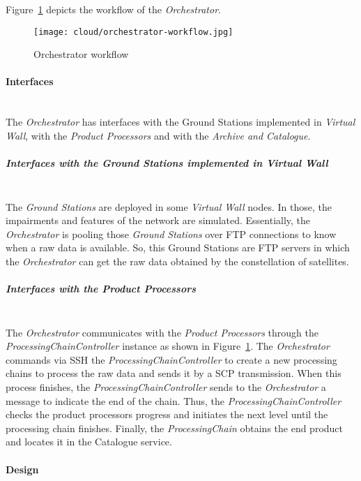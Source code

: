Figure~\ref{fig:orchestrator-workflow} depicts the workflow of the \emph{Orchestrator}.

\begin{figure}[!h]
\begin{center}
\texttt{[image: cloud/orchestrator-workflow.jpg]}
\caption{Orchestrator workflow}
\label{fig:orchestrator-workflow}
\end{center}
\end{figure}

\paragraph{Interfaces}~\\

The \emph{Orchestrator} has interfaces with the Ground Stations implemented in
\emph{Virtual Wall}, with the \emph{Product Processors} and with the
\emph{Archive and Catalogue}.
\subparagraph{Interfaces with the Ground Stations implemented in Virtual
  Wall}~\\

The \emph{Ground Stations} are deployed in some \emph{Virtual Wall} nodes. In
those, the impairments and features of the network are simulated. Essentially,
the \emph{Orchestrator} is pooling those \emph{Ground Stations} over \ac{FTP}
connections to know when a raw data is available. So, this Ground Stations are
\ac{FTP} servers in which the \emph{Orchestrator} can get the raw data obtained
by the constellation of satellites.

\subparagraph{Interfaces with the Product Processors}~\\

The \emph{Orchestrator} communicates with the \emph{Product Processors} through
the \emph{ProcessingChainController} instance as shown in
Figure~\ref{fig:orchestrator-workflow}. The \emph{Orchestrator} commands via
\ac{SSH} the \emph{ProcessingChainController} to create a new processing chains
to process the raw data and sends it by a \ac{SCP} transmission. When this process finishes, the \emph{ProcessingChainController} sends to the \emph{Orchestrator} a message to indicate the end of the chain. Thus, the \emph{ProcessingChainController} checks the product processors progress and initiates the next level until the processing chain finishes. Finally, the \emph{ProcessingChain} obtains the end product and locates it in the Catalogue service. 

\paragraph{Design}~\\

